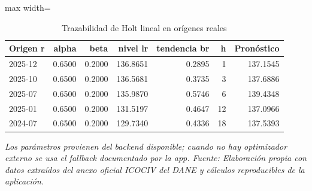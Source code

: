 \begin{table}[H]
\centering
\caption{Trazabilidad de Holt lineal en orígenes reales}
\label{tab:ejemplo_holt_lineal_vias_urbanas}
\scriptsize
\begin{adjustbox}{max width=\linewidth}
\begin{tabular}{lrrrrrr}
\toprule
Origen r & alpha & beta & nivel lr & tendencia br & h & Pronóstico \\
\midrule
2025-12 & 0.6500 & 0.2000 & 136.8651 & 0.2895 & 1 & 137.1545 \\
2025-10 & 0.6500 & 0.2000 & 136.5681 & 0.3735 & 3 & 137.6886 \\
2025-07 & 0.6500 & 0.2000 & 135.9870 & 0.5746 & 6 & 139.4348 \\
2025-01 & 0.6500 & 0.2000 & 131.5197 & 0.4647 & 12 & 137.0966 \\
2024-07 & 0.6500 & 0.2000 & 129.7340 & 0.4336 & 18 & 137.5393 \\
\bottomrule
\end{tabular}
\end{adjustbox}
\par\footnotesize\textit{Los parámetros provienen del backend disponible; cuando no hay optimizador externo se usa el fallback documentado por la app. Fuente: Elaboración propia con datos extraídos del anexo oficial ICOCIV del DANE y cálculos reproducibles de la aplicación.}
\end{table}
